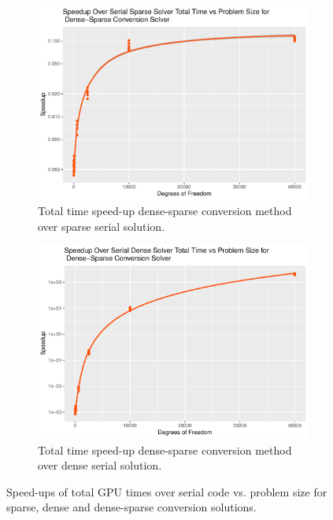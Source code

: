 \begin{figure}
\begin{subfigure}{0.48\linewidth}
		\includegraphics[width=\linewidth]{Plots/total_dnsspr_cpu_sparse_speedup_vs_n}
		\caption{Total time speed-up dense-sparse conversion method over sparse serial solution.}
		\label{fig:tot_dnsspr_sparse}
	\end{subfigure}\hfill
	\begin{subfigure}{0.48\linewidth}
		\centering
		\includegraphics[width=\linewidth]{Plots/total_dnsspr_cpu_dense_speedup_vs_n}
		\caption{Total time speed-up dense-sparse conversion method over dense serial solution.}
		\label{fig:tot_dnsspr_dense}
	\end{subfigure}
	\caption{Speed-ups of total GPU times over serial code vs. problem size for sparse, dense and dense-sparse conversion solutions.}
	\label{fig:tot}
\end{figure}

